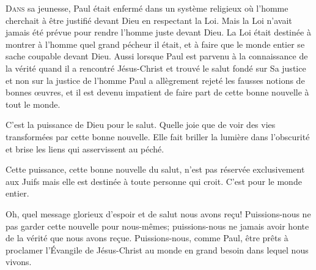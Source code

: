 



\lettrine{D}{ans} sa jeunesse, Paul était enfermé
 dans un système religieux où l'homme cherchait à être justifié
 devant Dieu en respectant la Loi.
 Mais la Loi n'avait jamais été prévue pour rendre
 l'homme juste devant Dieu. La Loi était destinée à montrer
 à l'homme quel grand pécheur il était, et à faire que le monde entier
 se sache coupable devant Dieu. Aussi lorsque Paul est parvenu
 à la connaissance de la vérité \ocadr quand il a rencontré Jésus-Christ
 et trouvé le salut fondé sur Sa justice et non sur la justice
 de l'homme \fcadr{} Paul a allègrement rejeté les fausses notions
 de bonnes \oe{}uvres, et il est devenu impatient de faire part
 de cette bonne nouvelle à tout le monde.


\Og C'est la puissance de Dieu pour le salut. \Fg{}
 Quelle joie que de voir des vies transformées par cette bonne nouvelle.
 Elle fait briller la lumière dans l'obscurité et brise les liens
 qui asservissent au péché.

Cette puissance, cette bonne nouvelle du salut, n'est pas réservée
 exclusivement aux Juifs mais elle est destinée à toute personne qui croit.
 C'est pour le monde entier.

Oh, quel message glorieux d'espoir et de salut
 nous avons re\c{c}u!  Puissions-nous ne pas garder cette nouvelle
 pour nous-mêmes; puissions-nous ne jamais avoir honte de la vérité
 que nous avons re\c{c}ue. Puissions-nous, comme Paul, être prêts à proclamer
 l'Évangile  de Jésus-Christ au monde en grand besoin
 dans lequel nous vivons.

\dvrule



